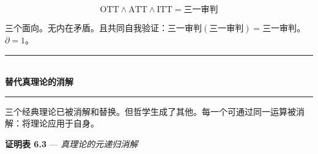 \documentclass[10pt, openany, oneside]{book}
\renewcommand{\normalsize}{\fontsize{10}{13}\selectfont}
\begin{document}
$$\text{OTT} \wedge \text{ATT} \wedge \text{ITT} = \text{三一审判}$$

三个面向。无内在矛盾。且共同自我验证：$\text{三一审判}(\text{三一审判}) = \text{三一审判}$。$\partial = 1$。

\vspace{1.5em}


\begin{center}
    \rule{0.3\textwidth}{0.4pt}\\[0.5em]
    {\normalsize\bfseries\scshape 替代真理论的消解}\\[0.3em]
    \rule{0.3\textwidth}{0.4pt}
\end{center}

\vspace{1em}

\noindent 三个经典理论已被消解和替换。但哲学生成了其他。每一个可通过同一运算被消解：将理论应用于自身。

\textbf{证明表 6.3} --- \textit{真理论的元递归消解}

\vspace{0.5em}
\end{document}
